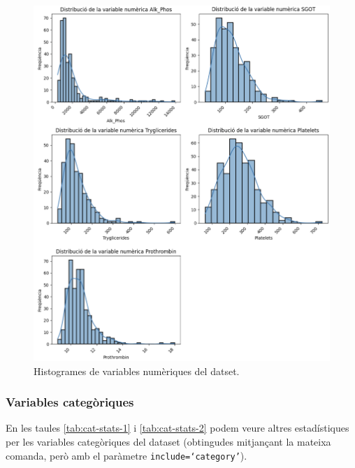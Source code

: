 \begin{figure}[H]
    \centering
    \includegraphics[width=\linewidth]{img/num-histograms-2.png}
    \caption{Histogrames de variables numèriques del datset.}
    \label{fig:num-histograms-2}
\end{figure}

\subsubsection{Variables categòriques}
En les taules \ref{tab:cat-stats-1} i \ref{tab:cat-stats-2} podem veure altres estadístiques per les variables categòriques del dataset (obtingudes mitjançant la mateixa comanda, però amb el paràmetre \texttt{include=`category'}).

